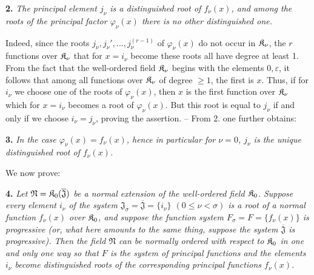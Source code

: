 \textbf{2.} \emph{The principal element $j_\nu$ is a distinguished root of $f_\nu(x)$, and among the roots of the principal factor $\varphi_\nu(x)$ there is no other distinguished one.}

Indeed, since the roots $j_\nu,j_\nu',\ldots,j_\nu^{(r-1)}$ of $\varphi_\nu(x)$ do not occur in $\mathfrak K_\nu$, the $r$ functions over $\mathfrak K_\nu$ that for $x=i_\nu$ become these roots all have degree at least 1. From the fact that the well-ordered field $\mathfrak K_\nu$ begins with the elements $0,\varepsilon$, it follows that among all functions over $\mathfrak K_\nu$ of degree $\geq1$, the first is $x$. Thus, if for $i_\nu$ we choose one of the roots of $\varphi_\nu(x)$, then $x$ is the first function over $\mathfrak K_\nu$ which for $x=i_\nu$ becomes a root of $\varphi_\nu(x)$. But this root is equal to $j_\nu$ if and only if we choose $i_\nu=j_\nu$, proving the assertion. -- From 2. one further obtains:

\textbf{3.} \emph{In the case $\varphi_\nu(x)=f_\nu(x)$, hence in particular for $\nu=0$, $j_\nu$ is the unique distinguished root of $f_\nu(x)$.}

We now prove:

\textbf{4.} \emph{Let $\mathfrak N=\mathfrak K_0(\overline{\mathfrak J})$ be a normal extension of the well-ordered field $\mathfrak K_0$. Suppose every element $i_\nu$ of the system $\mathfrak J_\sigma=\overline{\mathfrak J}=\{i_\nu\}$ $(0\leq\nu<\sigma)$ is a root of a normal function $f_\nu(x)$ over $\mathfrak K_0$, and suppose the function system $F_\sigma=F=\{f_\nu(x)\}$ is progressive (or, what here amounts to the same thing, suppose the system $\overline{\mathfrak J}$ is progressive). Then the field $\mathfrak N$ can be normally ordered with respect to $\mathfrak K_0$ in one and only one way so that $F$ is the system of principal functions and the elements $i_\nu$ become distinguished roots of the corresponding principal functions $f_\nu(x)$.}

